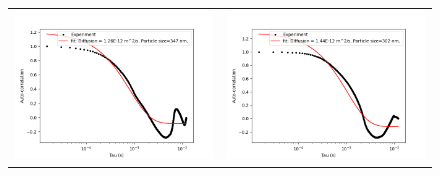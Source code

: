\begin{figure}
  \noindent
  \centering
  \begin{longtable}{p{7cm}p{7cm}}
    \includegraphics[width=8cm]{Images/AutoCor_Hijau_Data10-01.png}
    &
    \includegraphics[width=8cm]{Images/AutoCor_Merah_Data9-01.png}
   
  \end{longtable}
\end{figure}
